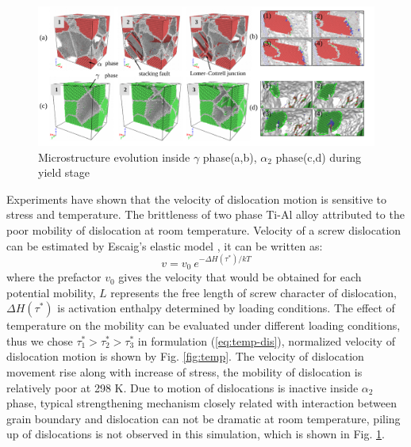 \documentclass[materials,article,submit,moreauthors,pdftex,10pt,a4paper]{Definitions/mdpi}
\begin{document}
\begin{figure}[ht] 
	\centering
	\includegraphics[width=1\linewidth]{img/def-box}
	\caption{Microstructure evolution inside $\gamma$ phase(a,b), $\alpha_2$ phase(c,d) during yield stage}
	\label{fig:Defect}
\end{figure}
Experiments have shown that the velocity of dislocation motion is sensitive to stress and temperature\cite{Stein1960}. The brittleness of two phase Ti-Al alloy attributed to the poor mobility of dislocation at room temperature. Velocity of a screw dislocation can be estimated by Escaig's elastic model \cite{Escaig1968}, it can be written as:
\begin{equation}\label{eq:temp-dis}
v = v_0\ e^{-\Delta H(\tau^*)/kT}
\end{equation}
where the prefactor $v_0$ gives the velocity that would be obtained for each potential mobility, $L$ represents the free length of screw character of dislocation, $\Delta H(\tau^*)$ is activation enthalpy determined by loading conditions. The effect of temperature on the mobility can be evaluated under different loading conditions, thus we chose  $\tau_1^*>\tau_2^*>\tau_3^*$ in formulation (\ref{eq:temp-dis}), normalized velocity of dislocation motion is shown by Fig. \ref{fig:temp}. The  velocity  of dislocation movement rise along with increase of  stress, the mobility  of dislocation is relatively poor at 298 K. Due to motion of dislocations is inactive inside $\alpha_2$ phase,  typical strengthening mechanism closely related with interaction between grain boundary and dislocation can not be dramatic at room temperature, piling up of dislocations is not observed in this simulation, which is shown in Fig. \ref{fig:Defect}.
\end{document}
